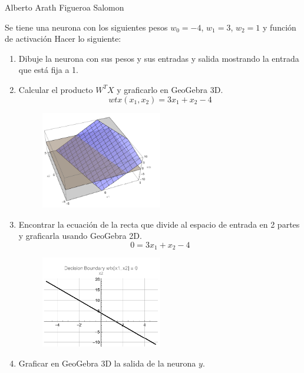 \documentclass{article}
\begin{document}
Alberto Arath Figueroa Salomon 
\newpage
\begin{flushleft}
Se tiene una neurona con los siguientes pesos $w_0=-4$, $w_1=3$, $w_2=1$ y función de activación
Hacer lo siguiente:

\begin{enumerate}
\item Dibuje la neurona con sus pesos y sus entradas y salida mostrando la entrada que está fija a 1.
\item Calcular el producto $W^T X$ y graficarlo en GeoGebra 3D.
\[ wtx(x_1, x_2) = 3 x_1 + x_2 - 4 \]
\begin{figure}[H]
  \centering
  \includegraphics[width=0.5\textwidth]{Imagen0.png}  %
\end{figure}
\item Encontrar la ecuación de la recta que divide al espacio de entrada en 2 partes y graficarla usando GeoGebra 2D.
\[ 0 = 3 x_1 + x_2 - 4 \]
\begin{figure}[H]
  \centering
  \includegraphics[width=0.5\textwidth]{Imagen1.png}  %
\end{figure}
\newpage
\item Graficar en GeoGebra 3D la salida de la neurona $y$.
\begin{figure}[H]
  \centering

\end{figure}
\end{enumerate}
\end{flushleft}
\end{document}

